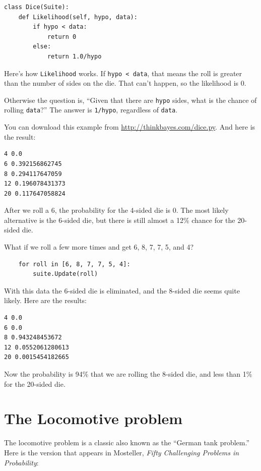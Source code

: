 \documentclass[12pt]{book}
\begin{document}
\begin{verbatim}
class Dice(Suite):
    def Likelihood(self, hypo, data):
        if hypo < data:
            return 0
        else:
            return 1.0/hypo
\end{verbatim}

Here's how \verb"Likelihood" works.  If \verb"hypo < data", that
means the roll is greater than the number of sides on the die.
That can't happen, so the likelihood is 0.

Otherwise the question is, ``Given that there are {\tt hypo}
sides, what is the chance of rolling {\tt data}?''  The
answer is \verb"1/hypo", regardless of {\tt data}.

You can download this example from \url{http://thinkbayes.com/dice.py}.
And here is the result:

\begin{verbatim}
4 0.0
6 0.392156862745
8 0.294117647059
12 0.196078431373
20 0.117647058824
\end{verbatim}

After we roll a 6, the probability for the 4-sided die is 0.  The
most likely alternative is the 6-sided die, but there is still
almost a 12\% chance for the 20-sided die.

What if we roll a few more times and get 6, 8, 7, 7, 5, and 4?

\begin{verbatim}
    for roll in [6, 8, 7, 7, 5, 4]:
        suite.Update(roll)
\end{verbatim}

With this data the 6-sided die is eliminated, and the 8-sided
die seems quite likely.  Here are the results:

\begin{verbatim}
4 0.0
6 0.0
8 0.943248453672
12 0.0552061280613
20 0.0015454182665
\end{verbatim}

Now the probability is 94\% that we are rolling the 8-sided die,
and less than 1\% for the 20-sided die.


\section{The Locomotive problem}

The locomotive problem is a classic also
known as the ``German tank problem.''  Here is the version
that appears in Mosteller, {\it Fifty Challenging Problems in
  Probability}:
\end{document}
